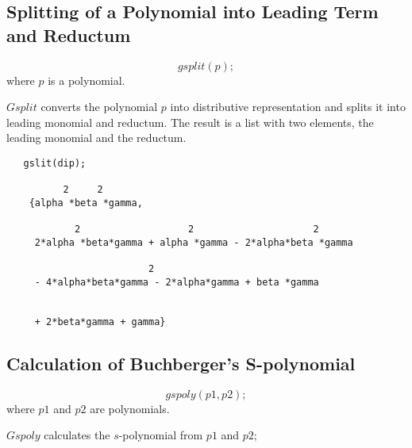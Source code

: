 \subsection{Splitting of a Polynomial into Leading Term and Reductum}
\[ gsplit (p); \]
where $p$ is a polynomial.

$Gsplit$ converts the polynomial $p$ into distributive representation
and splits it into leading monomial and reductum. The result is a list
with two elements, the leading monomial and the reductum.

\begin{verbatim}
   gslit(dip);

          2     2
    {alpha *beta *gamma,

            2                   2                     2
     2*alpha *beta*gamma + alpha *gamma - 2*alpha*beta *gamma

                         2
     - 4*alpha*beta*gamma - 2*alpha*gamma + beta *gamma


     + 2*beta*gamma + gamma}

 \end{verbatim}

\subsection{Calculation of Buchberger's S-polynomial}
\[ gspoly (p1,p2); \]
where $p1$  and $p2$ are polynomials.

$Gspoly$ calculates the $s$-polynomial from $p1$  and $p2$;

